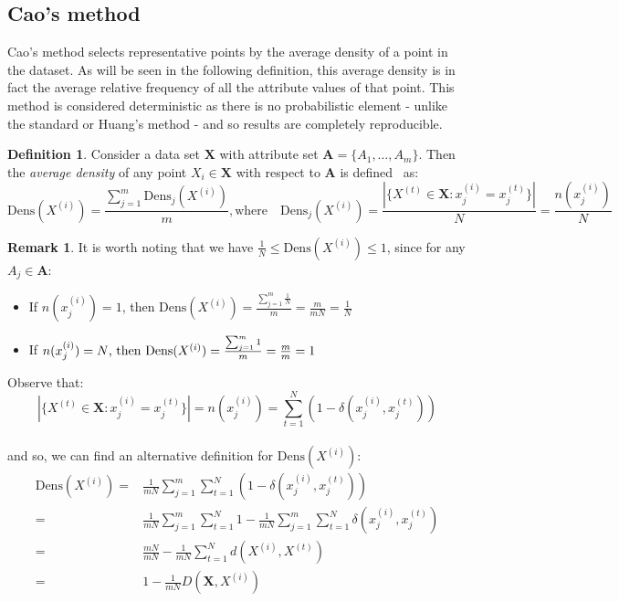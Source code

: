 \documentclass{article}
\theoremstyle{definition}
\newtheorem{definition}{Definition}[section]
\newtheorem*{remark}{Remark}
\begin{document}
\subsection{Cao's method}\label{subsection:cao}

Cao's method selects representative points by the average density of a point in
the dataset. As will be seen in the following definition, this average density 
is in fact the average relative frequency of all the attribute values of that 
point. This method is considered deterministic as there is no probabilistic 
element - unlike the standard or Huang's method - and so results are completely
reproducible.


\begin{definition}\label{def:density}	
    Consider a data set \(\textbf{X}\) with attribute set \(\textbf{A} = 
    \{A_1, \ldots, A_m\}\). Then the \emph{average density} of any point 
    \(X_i \in \textbf{X}\) with respect to \(\textbf{A}\) is 
    defined~\cite{Cao09} as:
	\[
	    \text{Dens}(X^{(i)}) = \frac{\sum_{j=1}^m \text{Dens}_{j}(X^{(i)})}{m}, 
        \text{where} \quad \text{Dens}_{j}(X^{(i)}) = \frac{|\{X^{(t)} \in 
        \textbf{X} : x_j^{(i)} = x_j^{(t)}\}|}{N} = \frac{n(x_j^{(i)})}{N}
	\]
\end{definition}

\begin{remark}
    It is worth noting that we have \(\frac{1}{N} \leq \text{Dens}(X^{(i)})
    \leq 1\), since for any \(A_j \in \textbf{A}\):		
	\begin{itemize}	
        \item If \(n(x_j^{(i)}) = 1\), then \(\text{Dens}(X^{(i)}) = 
			\frac{\sum_{j=1}^m \frac{1}{N}}{m} = \frac{m}{mN} = \frac{1}{N}\)
        \item If \(n(x_j^{(i)}) = N$, then $\text{Dens}(X^{(i)}) = 
            \frac{\sum_{j=1}^m 1}{m} = \frac{m}{m} = 1\)
	\end{itemize}
\end{remark}
    
Observe that:
\[
	|\{X^{(t)} \in \textbf{X} : x_j^{(i)} = x_j^{(t)}\}| = n(x_j^{(i)}) = 
	\sum_{t=1}^N (1 - \delta(x_j^{(i)}, x_j^{(t)}))
\]\\

and so, we can find an alternative definition for $\text{Dens}(X^{(i)})$:
\begin{equation}
\begin{aligned}
    \text{Dens}(X^{(i)}) = {} & {} \frac{1}{mN} \sum_{j=1}^m \sum_{t=1}^N 
                         (1 - \delta(x_j^{(i)}, x_j^{(t)}))
    \\
			             = {} & {} \frac{1}{mN} \sum_{j=1}^m \sum_{t=1}^N 1 - 
                         \frac{1}{mN} \sum_{j=1}^m \sum_{t=1}^N 
                         \delta(x_j^{(i)}, x_j^{(t)})
    \\
                         = {} & {} \frac{mN}{mN} - \frac{1}{mN} \sum_{t=1}^N 
                         d(X^{(i)}, X^{(t)})
    \\
			             = {} & {} 1 - \frac{1}{mN} D(\textbf{X}, X^{(i)})
\end{aligned}
\end{equation}\\
\end{document}
